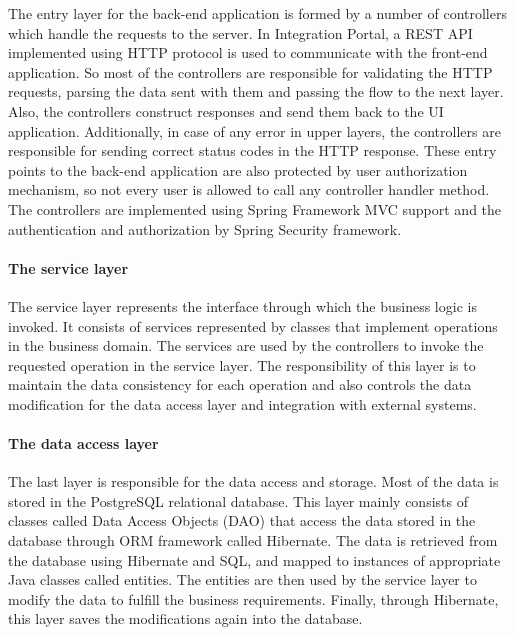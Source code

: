\documentclass{book}
\begin{document}
The entry layer for the back-end application is formed by a number of
controllers which handle the requests to the server. In Integration
Portal, a REST API implemented using HTTP protocol is used to
communicate with the front-end application. So most of the controllers
are responsible for validating the HTTP requests, parsing the data sent
with them and passing the flow to the next layer. Also, the controllers
construct responses and send them back to the UI application.
Additionally, in case of any error in upper layers, the controllers are
responsible for sending correct status codes in the HTTP response. These
entry points to the back-end application are also protected by user
authorization mechanism, so not every user is allowed to call any
controller handler method. The controllers are implemented using Spring
Framework MVC support and the authentication and authorization by Spring
Security framework.

\paragraph{The service layer}\label{the-service-layer}

The service layer represents the interface through which the business
logic is invoked. It consists of services represented by classes that
implement operations in the business domain. The services are used by
the controllers to invoke the requested operation in the service layer.
The responsibility of this layer is to maintain the data consistency for
each operation and also controls the data modification for the data
access layer and integration with external systems.

\paragraph{The data access layer}\label{the-data-access-layer}

The last layer is responsible for the data access and storage. Most of
the data is stored in the PostgreSQL relational database. This layer
mainly consists of classes called Data Access Objects (DAO) that access
the data stored in the database through ORM framework called Hibernate.
The data is retrieved from the database using Hibernate and SQL, and
mapped to instances of appropriate Java classes called entities. The
entities are then used by the service layer to modify the data to
fulfill the business requirements. Finally, through Hibernate, this
layer saves the modifications again into the database.
\end{document}
